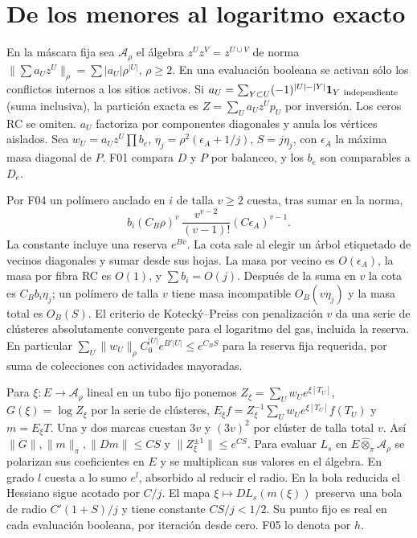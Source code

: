 \section{De los menores al logaritmo exacto}
En la máscara fija sea $\mathcal A_\rho$ el álgebra $z^U z^V=z^{U\cup V}$
de norma $\|\sum a_Uz^U\|_\rho=\sum |a_U|\rho^{|U|}$, $\rho\ge2$.
En una evaluación booleana se activan sólo los conflictos internos a los sitios activos.
Si $a_U=\sum_{Y\subset U}(-1)^{|U|-|Y|}{\bf1}_{Y\ {\rm independiente}}$
(suma inclusiva), la partición exacta es $Z=\sum_U a_Uz^U p_U$ por inversión.
Los ceros RC se omiten. $a_U$ factoriza por componentes diagonales y anula los
vértices aislados. Sea $w_U=a_Uz^U\prod b_e$, $\eta_j=\rho^2(\epsilon_A+1/j)$,
$S=j\eta_j$, con $\epsilon_A$ la máxima masa diagonal de $P$.
F01 compara $D$ y $P$ por balanceo, y los $b_e$ son comparables a $D_e$.

Por F04 un polímero anclado en $i$ de talla $v\ge2$ cuesta, tras sumar en la norma,
\[
 b_i(C_B\rho)^v\,\frac{v^{v-2}}{(v-1)!}(C\epsilon_A)^{v-1}.
\]
La constante incluye una reserva $e^{Bv}$. La cota sale al elegir un árbol
etiquetado de vecinos diagonales y sumar desde sus hojas. La masa por vecino es
$O(\epsilon_A)$, la masa por fibra RC es $O(1)$, y $\sum b_i=O(j)$.
Después de la suma en $v$ la cota es $C_B b_i\eta_j$; un polímero de talla $v$
tiene masa incompatible $O_B(v\eta_j)$ y la masa total es $O_B(S)$.
El criterio de Kotecký--Preiss con penalización $v$ da una serie de clústeres
absolutamente convergente para el logaritmo del gas, incluida la reserva.
En particular $\sum_U\|w_U\|_\rho C_0^{|U|}e^{B'|U|}\le e^{C_BS}$
para la reserva fija requerida, por suma de colecciones con actividades mayoradas.

Para $\xi:E\to\mathcal A_\rho$ lineal en un tubo fijo ponemos
$Z_\xi=\sum_U w_Ue^{\xi[T_U]}$, $G(\xi)=\log Z_\xi$ por la serie de clústeres,
$E_\xi f=Z_\xi^{-1}\sum_Uw_Ue^{\xi[T_U]}f(T_U)$ y $m=E_\xi T$.
Una y dos marcas cuestan $3v$ y $(3v)^2$ por clúster de talla total $v$.
Así $\|G\|,\|m\|_\pi,\|Dm\|\le CS$ y $\|Z_\xi^{\pm1}\|\le e^{CS}$.
Para evaluar $L_s$ en $E\widehat\otimes_\pi\mathcal A_\rho$ se polarizan sus
coeficientes en $E$ y se multiplican sus valores en el álgebra. En grado $l$ cuesta
a lo sumo $e^l$, absorbido al reducir el radio. En la bola reducida el Hessiano
sigue acotado por $C/j$. El mapa $\xi\mapsto DL_s(m(\xi))$ preserva una bola
de radio $C'(1+S)/j$ y tiene constante $CS/j<1/2$. Su punto fijo es real
en cada evaluación booleana, por iteración desde cero. F05 lo denota por $h$.

